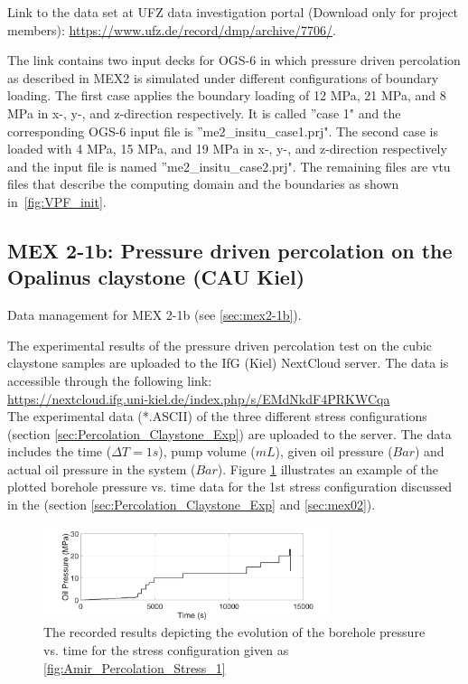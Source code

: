 Link to the data set at UFZ data investigation portal (Download only for project members):
\hyperlink{https://www.ufz.de/record/dmp/archive/7706/}{https://www.ufz.de/record/dmp/archive/7706/}.

The link contains two input decks for OGS-6 in which pressure driven percolation as described in MEX2 is simulated under different configurations of boundary loading.
The first case applies the boundary loading of 12 MPa, 21 MPa, and 8 MPa in x-, y-, and z-direction respectively. It is called ''case 1" and the corresponding OGS-6 input file is ''me2\_insitu\_case1.prj".
The second case is loaded with 4 MPa, 15 MPa, and 19 MPa in x-, y-, and z-direction respectively and the input file is named ''me2\_insitu\_case2.prj".
The remaining files are vtu files that describe the computing domain and the boundaries as shown in~\ref{fig:VPF_init}.

\subsection{MEX 2-1b: Pressure driven percolation on the Opalinus claystone (CAU Kiel)}

Data management for MEX 2-1b (see \ref{sec:mex2-1b}).

The experimental results of the pressure driven percolation test on the cubic claystone samples are uploaded to the IfG (Kiel) NextCloud server. The data is accessible through the following link:\\
\hyperlink{https://nextcloud.ifg.uni-kiel.de/index.php/s/EMdNkdF4PRKWCqa}{https://nextcloud.ifg.uni-kiel.de/index.php/s/EMdNkdF4PRKWCqa}\\

The experimental data (*.ASCII) of the three different stress configurations (section \ref{sec:Percolation_Claystone_Exp}) are uploaded to the server. The data includes the time ($\Delta T=1s$), pump volume ($mL$), given oil pressure ($Bar$) and actual oil pressure in the system ($Bar$). Figure \ref{fig:Amir_Percolation_Time_Pressure1_Data}
illustrates an example of the plotted borehole pressure vs. time data for the 1st stress configuration discussed in the (section \ref{sec:Percolation_Claystone_Exp} and \ref{sec:mex02}).

\begin{figure}[!ht]
\centering
\includegraphics[width=0.75\textwidth]{figures/Amir_Percolation_Time_Pressure1_Data.png}
\caption{The recorded results depicting the evolution of the borehole pressure vs. time for the stress configuration given as \ref{fig:Amir_Percolation_Stress_1}}
\label{fig:Amir_Percolation_Time_Pressure1_Data}
\end{figure}

